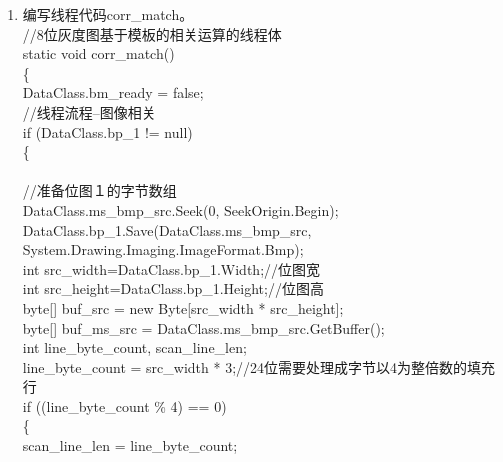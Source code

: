 ﻿\documentclass[12pt,a4paper,oneside]{book}
\begin{document}
\begin{enumerate}
\item 编写线程代码corr\_match。\\
\hspace*{0em}//8位灰度图基于模板的相关运算的线程体 \\
\hspace*{0em}static void corr\_match()\\
\hspace*{0em}\{\\
\hspace*{2em}DataClass.bm\_ready = false;\\
\hspace*{2em}//线程流程--图像相关\\
\hspace*{2em}if (DataClass.bp\_1 != null)\\
\hspace*{2em}\{\\
\hspace*{4em}\\
\hspace*{4em}//准备位图１的字节数组\\
\hspace*{4em}DataClass.ms\_bmp\_src.Seek(0, SeekOrigin.Begin);\\
\hspace*{4em}DataClass.bp\_1.Save(DataClass.ms\_bmp\_src, System.Drawing.Imaging.ImageFormat.Bmp); \\
\hspace*{4em}int src\_width=DataClass.bp\_1.Width;//位图宽\\
\hspace*{4em}int src\_height=DataClass.bp\_1.Height;//位图高\\
\hspace*{4em}byte[] buf\_src = new Byte[src\_width * src\_height];\\
\hspace*{4em}byte[] buf\_ms\_src = DataClass.ms\_bmp\_src.GetBuffer();\\
\hspace*{4em}int line\_byte\_count, scan\_line\_len;\\
\hspace*{4em}line\_byte\_count = src\_width * 3;//24位需要处理成字节以4为整倍数的填充行\\
\hspace*{4em}if ((line\_byte\_count \% 4) == 0)\\
\hspace*{4em}\{\\
\hspace*{6em}scan\_line\_len = line\_byte\_count;\\

\end{enumerate}
\end{document}
